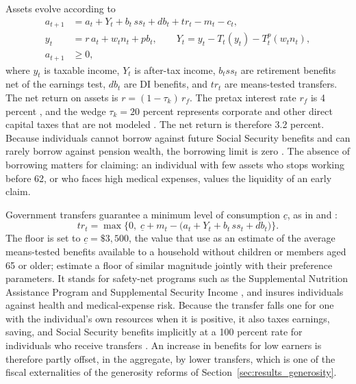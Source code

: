Assets evolve according to
\begin{equation}\label{eq:budget}
\begin{aligned}
a_{t+1}&=a_t+Y_t+b_t\,ss_t+db_t+tr_t-m_t-c_t,\\
y_t&=r\,a_t+w_t n_t+pb_t,\qquad Y_t=y_t-T_t(y_t)-T^p_t(w_t n_t),\\
a_{t+1}&\geq 0,
\end{aligned}
\end{equation}
where $y_t$ is taxable income, $Y_t$ is after-tax income, $b_t ss_t$ are retirement benefits net of the earnings test, $db_t$ are DI benefits, and $tr_t$ are means-tested transfers. The net return on assets is $r=(1-\tau_k)\,r_f$. The pretax interest rate $r_f$ is 4 percent \citep{french2005effects}, and the wedge $\tau_k=20$ percent represents corporate and other direct capital taxes that are not modeled \citep{Stantcheva2017}. The net return is therefore 3.2 percent. Because individuals cannot borrow against future Social Security benefits and can rarely borrow against pension wealth, the borrowing limit is zero \citep{Zeldes1989,Hubbard1995}. The absence of borrowing matters for claiming: an individual with few assets who stops working before 62, or who faces high medical expenses, values the liquidity of an early claim.

Government transfers guarantee a minimum level of consumption $\underline{c}$, as in \citet{Hubbard1995} and \citet{Denardi2010}:
\begin{equation}\label{eq:transfer}
tr_t=\max\Big\{0,\;\underline{c}+m_t-\big(a_t+Y_t+b_t\,ss_t+db_t\big)\Big\}.
\end{equation}
The floor is set to $\underline{c}=\$3{,}500$, the value that \citet{French2004} use as an estimate of the average means-tested benefits available to a household without children or members aged 65 or older; \citet{french2011effects} estimate a floor of similar magnitude jointly with their preference parameters. %
 It stands for safety-net programs such as the Supplemental Nutrition Assistance Program and Supplemental Security Income \citep[modeled explicitly by][]{Braun2017}, and insures individuals against health and medical-expense risk. Because the transfer falls one for one with the individual's own resources when it is positive, it also taxes earnings, saving, and Social Security benefits implicitly at a 100 percent rate for individuals who receive transfers \citep{Hubbard1995}. An increase in benefits for low earners is therefore partly offset, in the aggregate, by lower transfers, which is one of the fiscal externalities of the generosity reforms of Section~\ref{sec:results_generosity}.

